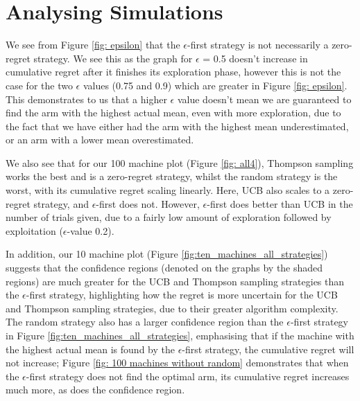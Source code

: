 \section{Analysing Simulations}\label{sec:analysing-simulations}
We see from Figure \ref{fig: epsilon} that the $\epsilon$-first strategy is not necessarily a zero-regret strategy.
We see this as the graph for $\epsilon$ = 0.5 doesn't increase in cumulative regret after it finishes its exploration phase, however this is not the case for the two $\epsilon$ values (0.75 and 0.9) which are greater in Figure \ref{fig: epsilon}.
This demonstrates to us that a higher $\epsilon$ value doesn't mean we are guaranteed to find the arm with the highest actual mean, even with more exploration, due to the fact that we have either had the arm with the highest mean underestimated, or an arm with a lower mean overestimated.

We also see that for our 100 machine plot (Figure \ref{fig: all4}), Thompson sampling works the best and is a zero-regret strategy, whilst the random strategy is the worst, with its cumulative regret scaling linearly.
Here, UCB also scales to a zero-regret strategy, and $\epsilon$-first does not.
However, $\epsilon$-first does better than UCB in the number of trials given, due to a fairly low amount of exploration followed by exploitation ($\epsilon$-value 0.2).

In addition, our 10 machine plot (Figure \ref{fig:ten_machines_all_strategies}) suggests that the confidence regions (denoted on the graphs by the shaded regions) are much greater for the UCB and Thompson sampling strategies than the $\epsilon$-first strategy, highlighting how the regret is more uncertain for the UCB and Thompson sampling strategies, due to their greater algorithm complexity.
The random strategy also has a larger confidence region than the $\epsilon$-first strategy in Figure \ref{fig:ten_machines_all_strategies}, emphasising that if the machine with the highest actual mean is found by the $\epsilon$-first strategy, the cumulative regret will not increase;
Figure \ref{fig: 100 machines without random} demonstrates that when the $\epsilon$-first strategy does not find the optimal arm, its cumulative regret increases much more, as does the confidence region.